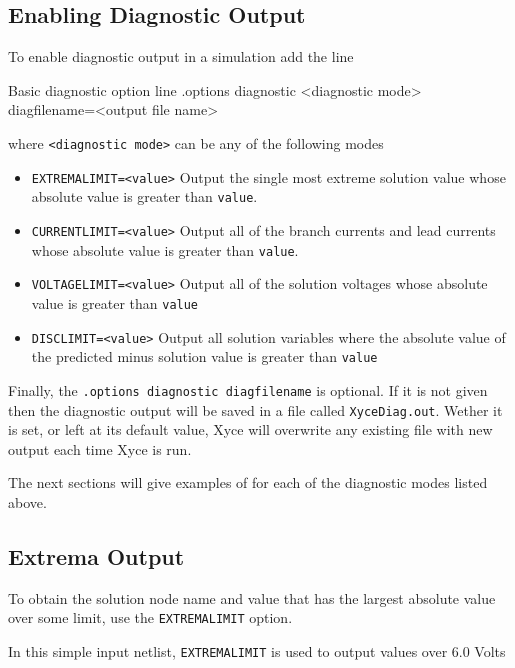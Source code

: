 \subsection{Enabling Diagnostic Output}
To enable diagnostic output in a simulation add the line
\begin{NetlistFigure}{Basic diagnostic option line}
.options diagnostic <diagnostic mode> diagfilename=<output file name>
\end{NetlistFigure}
where \texttt{<diagnostic mode>} can be any of the following modes
\begin{itemize}
  \item \texttt{EXTREMALIMIT=<value>}  Output the single most extreme solution value 
    whose absolute value is greater than \texttt{value}.
  \item \texttt{CURRENTLIMIT=<value>}  Output all of the branch currents and lead currents  
    whose absolute value is greater than \texttt{value}.
  \item \texttt{VOLTAGELIMIT=<value>}  Output all of the solution voltages  
    whose absolute value is greater than \texttt{value}
  \item \texttt{DISCLIMIT=<value>}  Output all solution variables where the absolute value
    of the predicted minus solution value is greater than \texttt{value}
\end{itemize}

Finally, the \texttt{.options diagnostic diagfilename} is optional.  If it is not given then 
the diagnostic output will be saved in a file called \texttt{XyceDiag.out}.  Wether it 
is set, or left at its default value, Xyce will overwrite any existing file with new 
output each time Xyce is run.  

The next sections will give examples of for each of the diagnostic modes listed above.

\subsection{Extrema Output}
To obtain the solution node name and value that has the largest absolute value over some 
limit, use the \texttt{EXTREMALIMIT} option. 

In this simple \Xyce{} input netlist, \texttt{EXTREMALIMIT} is used to output values over 6.0 Volts

